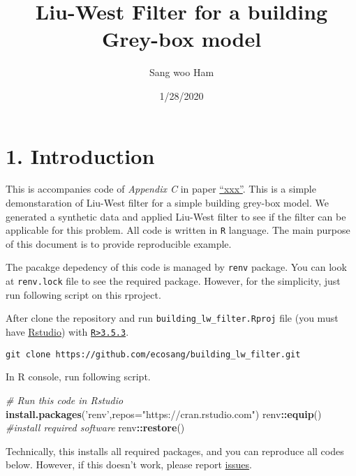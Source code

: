 \documentclass[
]{article}
\title{Liu-West Filter for a building Grey-box model}
\author{Sang woo Ham}
\date{1/28/2020}
\newenvironment{Shaded}{\begin{snugshade}}{\end{snugshade}}
\newcommand{\CommentTok}[1]{\textcolor[rgb]{0.56,0.35,0.01}{\textit{#1}}}
\newcommand{\DataTypeTok}[1]{\textcolor[rgb]{0.13,0.29,0.53}{#1}}
\newcommand{\KeywordTok}[1]{\textcolor[rgb]{0.13,0.29,0.53}{\textbf{#1}}}
\newcommand{\NormalTok}[1]{#1}
\newcommand{\OperatorTok}[1]{\textcolor[rgb]{0.81,0.36,0.00}{\textbf{#1}}}
\newcommand{\StringTok}[1]{\textcolor[rgb]{0.31,0.60,0.02}{#1}}
\begin{document}
\maketitle

{
\setcounter{tocdepth}{2}
\tableofcontents
}
\hypertarget{introduction}{%
\section{1. Introduction}\label{introduction}}

This is accompanies code of \emph{Appendix C} in paper
\href{https://dx.doi.org/}{``xxx''}. This is a simple demonstaration of
Liu-West filter for a simple building grey-box model. We generated a
synthetic data and applied Liu-West filter to see if the filter can be
applicable for this problem. All code is written in \texttt{R} language.
The main purpose of this document is to provide reproducible example.

The pacakge depedency of this code is managed by \texttt{renv} package.
You can look at \texttt{renv.lock} file to see the required package.
However, for the simplicity, just run following script on this rproject.

After clone the repository and run \texttt{building\_lw\_filter.Rproj}
file (you must have
\href{https://rstudio.com/products/rstudio/}{Rstudio}) with
\href{https://www.r-project.org/}{\texttt{R\textgreater{}3.5.3}}.

\begin{verbatim}
git clone https://github.com/ecosang/building_lw_filter.git
\end{verbatim}

In R console, run following script.

\begin{Shaded}
\begin{Highlighting}[]
\CommentTok{# Run this code in Rstudio}
\KeywordTok{install.packages}\NormalTok{(}\StringTok{'renv'}\NormalTok{,}\DataTypeTok{repos=}\StringTok{"https://cran.rstudio.com"}\NormalTok{)}
\NormalTok{renv}\OperatorTok{::}\KeywordTok{equip}\NormalTok{() }\CommentTok{#install required software}
\NormalTok{renv}\OperatorTok{::}\KeywordTok{restore}\NormalTok{()}
\end{Highlighting}
\end{Shaded}

Technically, this installs all required packages, and you can reproduce
all codes below. However, if this doesn't work, please report
\href{https://github.com/ecosang/building_lw_filter/issues}{issues}.
\end{document}
